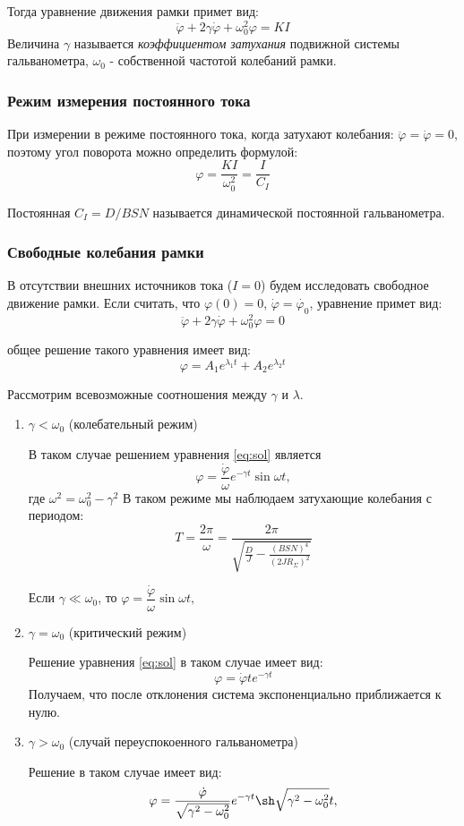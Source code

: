 \documentclass[a4paper, 12pt]{article}
\begin{document}
Тогда уравнение движения рамки примет вид:
\begin{equation}
\label{eq:diff}
\ddot{\varphi} +2\gamma\dot{\varphi} + \omega_0^2 \varphi = KI
\end{equation}
Величина $\gamma$ называется \textit{коэффициентом затухания} подвижной системы гальванометра,  $\omega_0$ - собственной частотой колебаний рамки.

\subsubsection*{Режим измерения постоянного тока}
При измерении в режиме постоянного тока, когда затухают колебания: $\ddot{\varphi} = \dot{\varphi} = 0$, поэтому угол поворота можно определить формулой:
$$\varphi = \dfrac{KI}{\omega_0^2} = \dfrac{I}{C_I}$$

Постоянная $C_I = D/BSN$ называется динамической постоянной гальванометра.

\subsubsection*{Свободные колебания рамки}

В отсутствии внешних источников тока ($I = 0$) будем исследовать свободное движение рамки.
Если считать, что $\varphi(0) = 0$, $\dot{\varphi} = \dot{\varphi_0}$, уравнение примет вид:
$$\ddot{\varphi} +2 \gamma \dot{\varphi} + \omega^2_0 \varphi = 0$$

общее решение такого уравнения имеет вид:
\begin{equation}
\varphi = A_1 e^{\lambda_1t} + A_2e^{\lambda_2t}
\label{eq:sol}
\end{equation}


Рассмотрим всевозможные соотношения между $\gamma$ и $\lambda$.

\begin{enumerate}

\item $\gamma < \omega_0$ (колебательный режим)

В таком случае решением уравнения \ref{eq:sol} является 
$$ \varphi = \dfrac{\dot{\varphi}}{\omega}e^{-\gamma t} \sin \omega t,$$
где $\omega^2 = \omega^2_0 - \gamma^2$
В таком режиме мы наблюдаем затухающие колебания с периодом:
$$T = \dfrac{2\pi}{\omega} = \dfrac{2 \pi}{\sqrt{\frac{D}{J} - \frac{(BSN)^4}{(2JR_\Sigma)^2}}}$$

Если $\gamma \ll \omega_0$, то $ \varphi = \dfrac{\dot{\varphi}}{\omega} \sin \omega t,$

\item $\gamma = \omega_0$ (критический режим)

Решение уравнения \ref{eq:sol} в таком случае имеет вид:
$$\varphi = \dot{\varphi	}te^{-\gamma   t}$$
Получаем, что после отклонения система экспоненциально приближается к нулю.

\item $\gamma > \omega_0$ (случай переуспокоенного гальванометра)

Решение в таком случае имеет вид:
$$ \varphi = \dfrac{\dot{\varphi}}{\sqrt{\gamma^2 - \omega_0^2}}e^{-\gamma t} \sh\sqrt{\gamma^2 - \omega_0^2}  t,$$
\end{enumerate}
\end{document}
